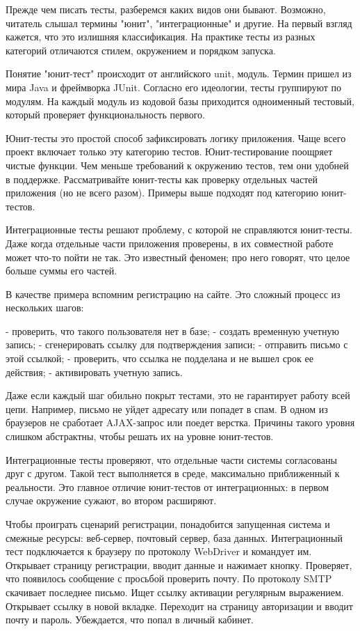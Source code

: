 Прежде чем писать тесты, разберемся каких видов они бывают. Возможно, читатель
слышал термины "юнит", "интеграционные" и другие. На первый взгляд кажется, что
это излишняя классификация. На практике тесты из разных категорий отличаются
стилем, окружением и порядком запуска.

Понятие "юнит-тест" происходит от английского unit, модуль. Термин пришел из
мира Java и фреймворка JUnit. Согласно его идеологии, тесты группируют по
модулям. На каждый модуль из кодовой базы приходится одноименный тестовый,
который проверяет функциональность первого.

Юнит-тесты это простой способ зафиксировать логику приложения. Чаще всего проект
включает только эту категорию тестов. Юнит-тестирование поощряет чистые
функции. Чем меньше требований к окружению тестов, тем они удобней в
поддержке. Рассматривайте юнит-тесты как проверку отдельных частей приложения
(но не всего разом). Примеры выше подходят под категорию юнит-тестов.

Интеграционные тесты решают проблему, с которой не справляются юнит-тесты. Даже
когда отдельные части приложения проверены, в их совместной работе может что-то
пойти не так. Это известный феномен; про него говорят, что целое больше суммы
его частей.


В качестве примера вспомним регистрацию на сайте. Это сложный процесс из
нескольких шагов:

- проверить, что такого пользователя нет в базе;
- создать временную учетную запись;
- сгенерировать ссылку для подтверждения записи;
- отправить письмо с этой ссылкой;
- проверить, что ссылка не подделана и не вышел срок ее действия;
- активировать учетную запись.

Даже если каждый шаг обильно покрыт тестами, это не гарантирует работу всей
цепи. Например, письмо не уйдет адресату или попадет в спам. В одном из
браузеров не сработает AJAX-запрос или поедет верстка. Причины такого уровня
слишком абстрактны, чтобы решать их на уровне юнит-тестов.

Интеграционные тесты проверяют, что отдельные части системы согласованы друг с
другом. Такой тест выполняется в среде, максимально приближенный к
реальности. Это главное отличие юнит-тестов от интеграционных: в первом случае
окружение сужают, во втором расширяют.

Чтобы проиграть сценарий регистрации, понадобится запущенная система и смежные
ресурсы: веб-сервер, почтовый сервер, база данных. Интеграционный тест
подключается к браузеру по протоколу WebDriver и командует им. Открывает
страницу регистрации, вводит данные и нажимает кнопку. Проверяет, что появилось
сообщение с просьбой проверить почту. По протоколу SMTP скачивает последнее
письмо. Ищет ссылку активации регулярным выражением. Открывает ссылку в новой
вкладке. Переходит на страницу авторизации и вводит почту и пароль. Убеждается,
что попал в личный кабинет.

